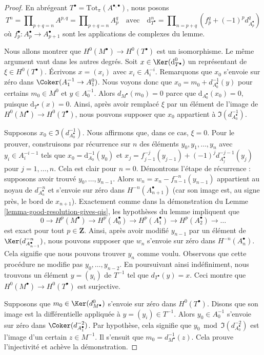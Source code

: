 \begin{proof}
En abrégeant $T^\bullet = \text{Tot}_\pi(A^{\bullet, \bullet})$,
nous posons
$$
T^n = \prod\nolimits_{p + q = n} A^{p, q} =
\prod\nolimits_{p + q = n} A_p^q
\quad\text{avec}\quad
\text{d}_{T^\bullet}^n =
\prod\nolimits_{n = p + q} (f_p^q + (-1)^pd_{A_p^\bullet}^q)
$$
où $f_p^\bullet : A_p^\bullet \to A_{p + 1}^\bullet$
sont les applications de complexes du lemme.

\medskip\noindent
Nous allons montrer que $H^0(M^\bullet) \to H^0(T^\bullet)$ est un
isomorphisme. Le même argument vaut dans les autres degrés.
Soit $x \in \Ker(\text{d}_{T^\bullet}^0)$ un représentant de
$\xi \in H^0(T^\bullet)$.
Écrivons $x = (x_i)$ avec $x_i \in A_i^{-i}$.
Remarquons que $x_0$ s'envoie sur zéro dans
$\Coker(A_1^{-1} \to A_1^0)$.
Nous voyons donc que $x_0 = m_0 + d_{A_0^\bullet}^{-1}(y)$ pour certains
$m_0 \in M^0$ et $y \in A_0^{-1}$.
Alors $d_{M^\bullet}(m_0) = 0$ parce que
$\text{d}_{A_0^\bullet}(x_0) = 0$, puisque
$\text{d}_{T^\bullet}(x) = 0$.
Ainsi, après avoir remplacé $\xi$ par un élément de l'image de
$H^0(M^\bullet) \to H^0(T^\bullet)$, nous pouvons supposer que $x_0$
appartient à $\Im(d^{-1}_{A_0^\bullet})$.

\medskip\noindent
Supposons $x_0 \in \Im(d^{-1}_{A_0^\bullet})$. Nous affirmons que, dans ce
cas, $\xi = 0$. Pour le prouver, construisons par récurrence sur $n$ des
éléments $y_0, y_1, \ldots, y_n$ avec $y_i \in A_i^{-i - 1}$ tels que
$x_0 = \text{d}_{A_0}^{-1}(y_0)$ et
$x_j = f_{j - 1}^{-j}(y_{j - 1}) + (-1)^j d^{-j - 1}_{A_j^\bullet}(y_j)$
pour $j = 1, \ldots, n$. Cela est clair pour $n = 0$. Démontrons l'étape
de récurrence : supposons avoir trouvé $y_0, \ldots, y_{n - 1}$. Alors
$w_n = x_n - f_{n - 1}^{-n}(y_{n - 1})$ appartient au noyau de
$d^{-n}_{A_n^\bullet}$ et s'envoie sur zéro dans $H^{-n}(A_{n + 1}^\bullet)$
(car son image est, au signe près, le bord de $x_{n + 1}$). Exactement
comme dans la démonstration du
Lemme \ref{lemma-good-resolution-gives-qis},
les hypothèses du lemme impliquent que
$$
0 \to
H^p(M^\bullet) \to
H^p(A_0^\bullet) \to
H^p(A_1^\bullet) \to
H^p(A_2^\bullet) \to \ldots
$$
est exact pour tout $p \in \mathbf{Z}$. Ainsi, après avoir modifié
$y_{n - 1}$ par un élément de $\Ker(d^{-n}_{A_{n - 1}^\bullet})$,
nous pouvons supposer que $w_n$ s'envoie sur zéro dans
$H^{-n}(A_n^\bullet)$. Cela signifie que nous pouvons trouver $y_n$ comme
voulu. Observons que cette procédure ne modifie pas
$y_0, \ldots, y_{n - 2}$. En poursuivant ainsi indéfiniment, nous trouvons
un élément $y = (y_i)$ de $T^{-1}$ tel que $d_{T^\bullet}(y) = x$.
Ceci montre que $H^0(M^\bullet) \to H^0(T^\bullet)$ est surjective.

\medskip\noindent
Supposons que $m_0 \in \Ker(d^0_{M^\bullet})$ s'envoie sur zéro dans
$H^0(T^\bullet)$. Disons que son image est la différentielle appliquée
à $y = (y_i) \in T^{-1}$.
Alors $y_0 \in A_0^{-1}$ s'envoie sur zéro dans
$\Coker(d^{-2}_{A_1^\bullet})$.
Par hypothèse, cela signifie que
$y_0 \bmod \Im(d^{-2}_{A_0^\bullet})$
est l'image d'un certain $z \in M^{-1}$. Il s'ensuit que
$m_0 = d^{-1}_{M^\bullet}(z)$. Cela prouve l'injectivité et achève la
démonstration.
\end{proof}

